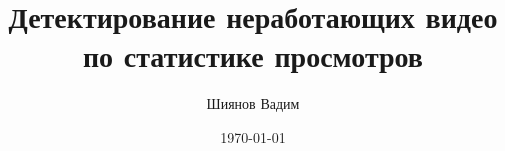 \documentclass{beamer}
\title{Детектирование неработающих видео по статистике просмотров}
\author{Шиянов Вадим}
\institute{МФТИ (НИУ)}
\date{\today}
\begin{document}
\begin{frame}
\titlepage
\end{frame}
\end{document}
